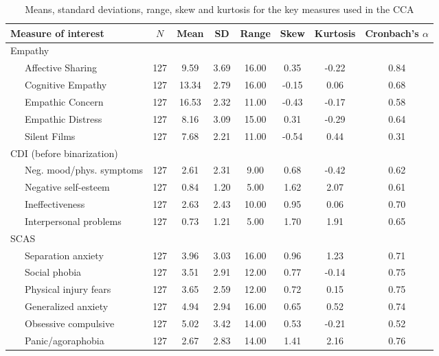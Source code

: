\documentclass[
  english,
  man,floatsintext]{apa6}
\begin{document}
\begin{table}[tbp]

\begin{center}
\begin{threeparttable}

\caption{\label{tab:table1}Means, standard deviations, range, skew and kurtosis for the key measures used in the CCA}

\small{

\begin{tabular}{lccccccc}
\toprule
Measure of interest & $N$ & Mean & SD & Range & Skew & Kurtosis & Cronbach’s $\alpha$\\
\midrule
Empathy &  &  &  &  &  &  & \\
\ \ \ Affective Sharing & 127 & 9.59 & 3.69 & 16.00 & 0.35 & -0.22 & 0.84\\
\ \ \ Cognitive Empathy & 127 & 13.34 & 2.79 & 16.00 & -0.15 & 0.06 & 0.68\\
\ \ \ Empathic Concern & 127 & 16.53 & 2.32 & 11.00 & -0.43 & -0.17 & 0.58\\
\ \ \ Empathic Distress & 127 & 8.16 & 3.09 & 15.00 & 0.31 & -0.29 & 0.64\\
\ \ \ Silent Films & 127 & 7.68 & 2.21 & 11.00 & -0.54 & 0.44 & 0.31\\
CDI (before binarization) &  &  &  &  &  &  & \\
\ \ \ Neg. mood/phys. symptoms & 127 & 2.61 & 2.31 & 9.00 & 0.68 & -0.42 & 0.62\\
\ \ \ Negative self-esteem & 127 & 0.84 & 1.20 & 5.00 & 1.62 & 2.07 & 0.61\\
\ \ \ Ineffectiveness & 127 & 2.63 & 2.43 & 10.00 & 0.95 & 0.06 & 0.70\\
\ \ \ Interpersonal problems & 127 & 0.73 & 1.21 & 5.00 & 1.70 & 1.91 & 0.65\\
SCAS &  &  &  &  &  &  & \\
\ \ \ Separation anxiety & 127 & 3.96 & 3.03 & 16.00 & 0.96 & 1.23 & 0.71\\
\ \ \ Social phobia & 127 & 3.51 & 2.91 & 12.00 & 0.77 & -0.14 & 0.75\\
\ \ \ Physical injury fears & 127 & 3.65 & 2.59 & 12.00 & 0.72 & 0.15 & 0.75\\
\ \ \ Generalized anxiety & 127 & 4.94 & 2.94 & 16.00 & 0.65 & 0.52 & 0.74\\
\ \ \ Obsessive compulsive & 127 & 5.02 & 3.42 & 14.00 & 0.53 & -0.21 & 0.52\\
\ \ \ Panic/agoraphobia & 127 & 2.67 & 2.83 & 14.00 & 1.41 & 2.16 & 0.76\\
\bottomrule
\end{tabular}

}

\end{threeparttable}
\end{center}

\end{table}
\end{document}
